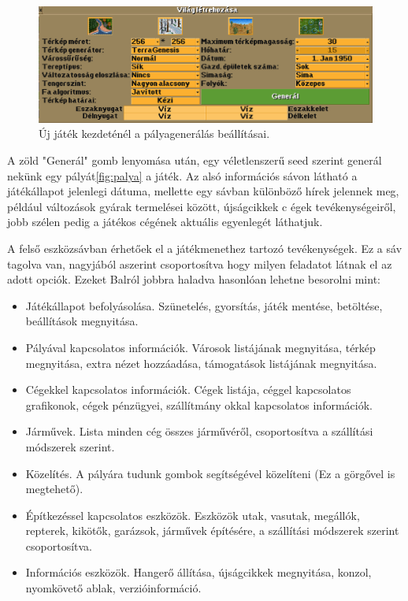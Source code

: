 \begin{figure}
	\centering
	\includegraphics[scale=0.5]{images/generalas.png}
	\caption{Új játék kezdeténél a pályagenerálás beállításai.}
	\label{fig:generalas}
\end{figure}

A zöld "Generál" gomb lenyomása után, egy véletlenszerű seed szerint generál nekünk egy pályát\ref{fig:palya} a játék. Az alsó információs sávon látható a játékállapot jelenlegi dátuma, mellette egy sávban különböző hírek jelennek meg, például változások gyárak termelései között, újságcikkek c égek tevékenységeiről, jobb szélen pedig a játékos cégének aktuális egyenlegét láthatjuk.

A felső eszközsávban érhetőek el a játékmenethez tartozó tevékenységek. Ez a sáv tagolva van, nagyjából aszerint csoportosítva hogy milyen feladatot látnak el az adott opciók. Ezeket Balról jobbra haladva hasonlóan lehetne besorolni mint:

\begin{itemize}
	\item Játékállapot befolyásolása. Szünetelés, gyorsítás, játék mentése, betöltése, beállítások megnyitása.
	\item Pályával kapcsolatos információk. Városok listájának megnyitása, térkép megnyitása, extra nézet hozzáadása, támogatások listájának megnyitása.
	\item Cégekkel kapcsolatos információk. Cégek listája, céggel kapcsolatos grafikonok, cégek pénzügyei, szállítmány okkal kapcsolatos információk.
	\item Járművek. Lista minden cég összes járművéről, csoportosítva a szállítási módszerek szerint.
	\item Közelítés. A pályára tudunk gombok segítségével közelíteni (Ez a görgővel is megtehető).
	\item Építkezéssel kapcsolatos eszközök. Eszközök utak, vasutak, megállók, repterek, kikötők, garázsok, járművek építésére, a szállítási módszerek szerint csoportosítva.
	\item Információs eszközök. Hangerő állítása, újságcikkek megnyitása, konzol, nyomkövető ablak, verzióinformáció.
\end{itemize}

